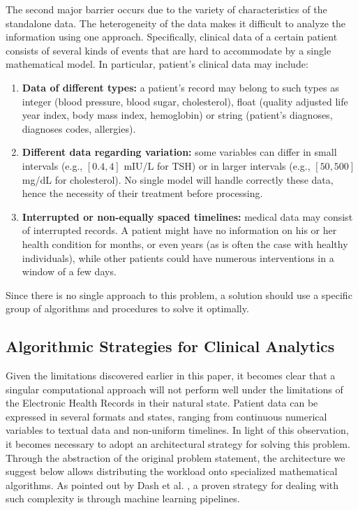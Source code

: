 The second major barrier occurs due to the variety of characteristics of the standalone data. The heterogeneity of the data makes it difficult to analyze the information using one approach. Specifically, clinical data of a certain patient consists of several kinds of events that are hard to accommodate by a single mathematical model. In particular, patient's clinical data may include:
\vspace{0.2em}
\begin{enumerate}
    \item \textbf{Data of different types:} a patient's record may belong to such types as integer (blood pressure, blood sugar, cholesterol), float (quality adjusted life year index, body mass index, hemoglobin) or string (patient's diagnoses, diagnoses codes, allergies).

    \item \textbf{Different data regarding variation:} some variables can differ in small intervals (e.g., $[0.4, 4]$ mIU/L for TSH) or in larger intervals (e.g., $[50, 500]$ mg/dL for cholesterol). No single model will handle correctly these data, hence the necessity of their treatment before processing.

    \item \textbf{Interrupted or non-equally spaced timelines:} medical data may consist of interrupted records. A patient might have no information on his or her health condition for months, or even years (as is often the case with healthy individuals), while other patients could have numerous interventions in a window of a few days.
\end{enumerate}
\vspace{1em}
Since there is no single approach to this problem, a solution should use a specific group of algorithms and procedures to solve it optimally.
\subsection{Algorithmic Strategies for Clinical Analytics}

Given the limitations discovered earlier in this paper, it becomes clear that a singular computational approach will not perform well under the limitations of the Electronic Health Records in their natural state. Patient data can be expressed in several formats and states, ranging from continuous numerical variables to textual data and non-uniform timelines. In light of this observation, it becomes necessary to adopt an architectural strategy for solving this problem. Through the abstraction of the original problem statement, the architecture we suggest below allows distributing the workload onto specialized mathematical algorithms. As pointed out by Dash et al. \cite{dash2019}, a proven strategy for dealing with such complexity is through machine learning pipelines.

